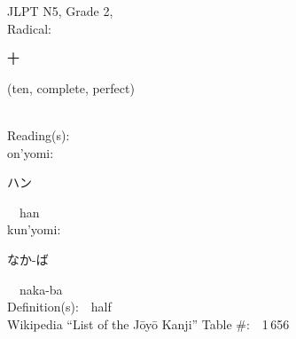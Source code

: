 \begin{multicols}{2}
{JLPT N5, Grade 2, \\Radical:\ \ {\begin{CJK}{UTF8}{min} 十 \end{CJK}} (ten, complete, perfect) } \\
Reading(s):\ \ \\
{\hspace*{1em}}on'yomi:\ \ \\
{\hspace*{2em}}{\begin{CJK}{UTF8}{min} ハン \end{CJK}}\ \ han\ \ \\
{\hspace*{1em}}kun'yomi:\ \ \\
{\hspace*{2em}}{\begin{CJK}{UTF8}{min} なか-ば \end{CJK}}\ \ naka-ba\ \ \\
Definition(s):\ \ half \\
Wikipedia ``List of the J\=oy\=o Kanji'' Table \#:\ \ 1\,656 \\
\ \ \\
\end{multicols}



